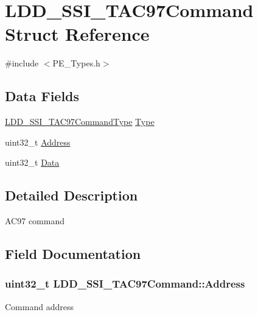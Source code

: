 \hypertarget{struct_l_d_d___s_s_i___t_a_c97_command}{}\section{L\+D\+D\+\_\+\+S\+S\+I\+\_\+\+T\+A\+C97\+Command Struct Reference}
\label{struct_l_d_d___s_s_i___t_a_c97_command}


{\ttfamily \#include $<$P\+E\+\_\+\+Types.\+h$>$}

\subsection*{Data Fields}
\begin{DoxyCompactItemize}
\item 
\hyperlink{group___p_e___types__module_gac7398329f7fdf5c8834b026e63f5edc2}{L\+D\+D\+\_\+\+S\+S\+I\+\_\+\+T\+A\+C97\+Command\+Type} \hyperlink{struct_l_d_d___s_s_i___t_a_c97_command_ac7226beaf57a764f71faf7e822e27a6e}{Type}
\item 
uint32\+\_\+t \hyperlink{struct_l_d_d___s_s_i___t_a_c97_command_a0d39df5cae85e73b036af81e9fbc6332}{Address}
\item 
uint32\+\_\+t \hyperlink{struct_l_d_d___s_s_i___t_a_c97_command_abc16535d09d61f2c3f885adf91632117}{Data}
\end{DoxyCompactItemize}


\subsection{Detailed Description}
A\+C97 command 

\subsection{Field Documentation}
\subsubsection[{\texorpdfstring{Address}{Address}}]{\setlength{\rightskip}{0pt plus 5cm}uint32\+\_\+t L\+D\+D\+\_\+\+S\+S\+I\+\_\+\+T\+A\+C97\+Command\+::\+Address}\hypertarget{struct_l_d_d___s_s_i___t_a_c97_command_a0d39df5cae85e73b036af81e9fbc6332}{}\label{struct_l_d_d___s_s_i___t_a_c97_command_a0d39df5cae85e73b036af81e9fbc6332}
Command address 
